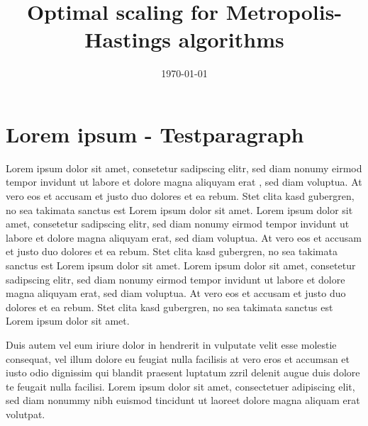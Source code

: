 \documentclass[10pt, a4paper, UKenglish, twoside, final]{article}
\date{\today}
\title{Optimal scaling for Metropolis-Hastings algorithms}
\begin{document}
\maketitle

\pagestyle{empty} %


\cleardoublepage %

\tableofcontents %

\cleardoublepage %
\pagestyle{fancy} %
\setcounter{page}{1} %



\clearpage{\pagestyle{empty}\cleardoublepage} %



\clearpage{\pagestyle{empty}\cleardoublepage} %

\section[Lorem ipsum]{Lorem ipsum - Testparagraph}

Lorem ipsum \autocite{Knuth:TeXbook} dolor sit amet, consetetur \autocite{pillai2012} sadipscing elitr, sed diam nonumy eirmod tempor invidunt ut labore et dolore magna aliquyam erat \autocite{roberts1997} , sed diam voluptua. At vero eos et accusam et justo duo dolores et ea rebum. Stet clita kasd gubergren, no sea takimata sanctus est Lorem ipsum dolor sit amet. Lorem ipsum dolor sit amet, consetetur sadipscing elitr, sed diam nonumy eirmod tempor invidunt ut labore et dolore magna aliquyam erat, sed diam voluptua. At vero eos et accusam et justo duo dolores et ea rebum. Stet clita kasd gubergren, no sea takimata sanctus est Lorem ipsum dolor sit amet. Lorem ipsum dolor sit amet, consetetur sadipscing elitr, sed diam nonumy eirmod tempor invidunt ut labore et dolore magna aliquyam erat, sed diam voluptua. At vero eos et accusam et justo duo dolores et ea rebum. Stet clita kasd gubergren, no sea takimata sanctus est Lorem ipsum dolor sit amet.   

Duis autem vel eum iriure dolor in hendrerit in vulputate velit esse molestie consequat, vel illum dolore eu feugiat nulla facilisis at vero eros et accumsan et iusto odio dignissim qui blandit praesent luptatum zzril delenit augue duis dolore te feugait nulla facilisi. Lorem ipsum dolor sit amet, consectetuer adipiscing elit, sed diam nonummy nibh euismod tincidunt ut laoreet dolore magna aliquam erat volutpat.   

\clearpage{\pagestyle{empty}\cleardoublepage} %

\appendix
\printbibliography

\end{document}
